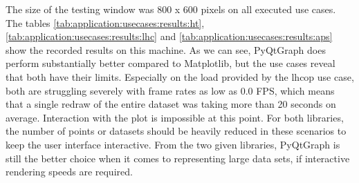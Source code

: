 The size of the testing window was 800 x 600 pixels on all executed use cases.
The tables \ref{tab:application:usecases:results:ht},
\ref{tab:application:usecases:results:lhc} and
\ref{tab:application:usecases:results:aps} show the recorded results on this
machine. As we can see, PyQtGraph does perform substantially better compared to
Matplotlib, but the use cases reveal that both have their limits.
Especially on the load provided by the \gls{lhcop} use case, both are struggling
severely with frame rates as low as 0.0 FPS, which means that a single redraw of
the entire dataset was taking more than 20 seconds on average. Interaction
with the plot is impossible at this point. For both libraries, the number of
points or datasets should be heavily reduced in these scenarios to keep the user
interface interactive. From the two given libraries, PyQtGraph is still the
better choice when it comes to representing large data sets, if interactive
rendering speeds are required.


